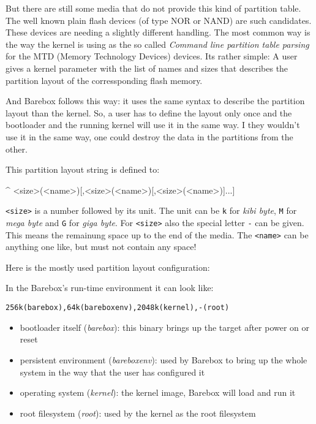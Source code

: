 But there are still some media that do not provide this kind of partition table.
The well known plain flash devices (of type NOR or NAND) are such candidates.
These devices are needing a slightly different handling. The most common way is
the way the kernel is using as the so called \textit{Command line partition
table parsing} for the MTD (Memory Technology Devices) devices. Its rather
simple: A user gives a kernel parameter with the list of names and sizes that
describes the partition layout of the corressponding flash memory.

%
%

And Barebox follows this way: it uses the same syntax to describe the partition
layout than the kernel. So, a user has to define the layout only once and the
bootloader and the running kernel will use it in the same way. I they wouldn't
use it in the same way, one could destroy the data in the partitions from the
other.

This partition layout string is defined to:

\begin{ptxshell}[escapechar=|]{^}
<size>(<name>)[,<size>(<name>)[,<size>(<name>)]...]
\end{ptxshell}

\texttt{<size>} is a number followed by its unit. The unit can be \texttt{k} for
\textit{kibi byte}, \texttt{M} for \textit{mega byte} and \texttt{G} for
\textit{giga byte}. For \texttt{<size>} also the special letter \texttt{-}
can be given. This means the remainung space up to the end of the media. The
\texttt{<name>} can be anything one like, but must not contain any space!

Here is the mostly used partition layout configuration:

In the Barebox's run-time environment it can look like:

\texttt{256k(barebox),64k(bareboxenv),2048k(kernel),-(root)}

\begin{itemize}
 \item bootloader itself (\textit{barebox}): this binary brings up the target
  after power on or reset
 \item persistent environment (\textit{bareboxenv}): used by Barebox to bring up
  the whole system in the way that the user has configured it
 \item operating system (\textit{kernel}): the kernel image, Barebox will load
  and run it
 \item root filesystem (\textit{root}): used by the kernel as the root
  filesystem
\end{itemize}

